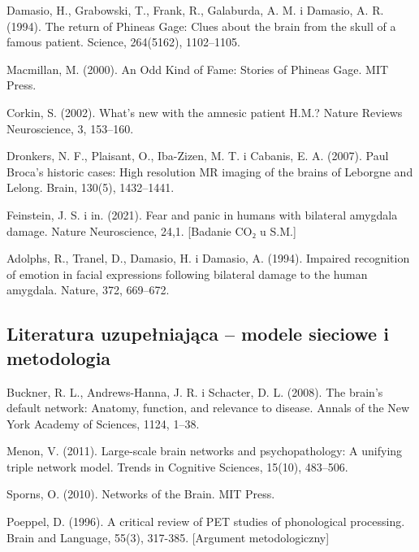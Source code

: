 \documentclass[11pt,a4paper]{article}
\begin{document}
Damasio, H., Grabowski, T., Frank, R., Galaburda, A. M. i Damasio, A. R. (1994). The return of Phineas Gage: Clues about the brain from the skull of a famous patient. Science, 264(5162), 1102–1105.

Macmillan, M. (2000). An Odd Kind of Fame: Stories of Phineas Gage. MIT Press.

Corkin, S. (2002). What's new with the amnesic patient H.M.? Nature Reviews Neuroscience, 3, 153–160.

Dronkers, N. F., Plaisant, O., Iba-Zizen, M. T. i Cabanis, E. A. (2007). Paul Broca's historic cases: High resolution MR imaging of the brains of Leborgne and Lelong. Brain, 130(5), 1432–1441.

Feinstein, J. S. i in. (2021). Fear and panic in humans with bilateral amygdala damage. Nature Neuroscience, 24,1. [Badanie CO₂ u S.M.]

Adolphs, R., Tranel, D., Damasio, H. i Damasio, A. (1994). Impaired recognition of emotion in facial expressions following bilateral damage to the human amygdala. Nature, 372, 669–672.


\subsection{Literatura uzupełniająca – modele sieciowe i metodologia}

Buckner, R. L., Andrews-Hanna, J. R. i Schacter, D. L. (2008). The brain's default network: Anatomy, function, and relevance to disease. Annals of the New York Academy of Sciences, 1124, 1–38.

Menon, V. (2011). Large-scale brain networks and psychopathology: A unifying triple network model. Trends in Cognitive Sciences, 15(10), 483–506.

Sporns, O. (2010). Networks of the Brain. MIT Press.

Poeppel, D. (1996). A critical review of PET studies of phonological processing. Brain and Language, 55(3), 317-385. [Argument metodologiczny]
\end{document}
